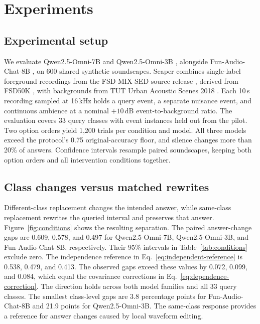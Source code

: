 \section{Experiments}
\label{sec:results}

\subsection{Experimental setup}
We evaluate Qwen2.5-Omni-7B and Qwen2.5-Omni-3B
\cite{qwen25omni2025}, alongside Fun-Audio-Chat-8B
\cite{funaudiochat2026}, on 600 shared synthetic soundscapes. Scaper
\cite{salamon2017scaper} combines single-label foreground recordings from
the FSD-MIX-SED source release \cite{wang2021shots}, derived from FSD50K
\cite{fonseca2021fsd50k}, with backgrounds from TUT Urban Acoustic Scenes
2018 \cite{heittola2018tut}. Each 10\,s recording sampled at 16\,kHz holds a
query event, a separate nuisance event, and continuous ambience at a nominal
$+10$\,dB event-to-background ratio. The evaluation covers 33 query classes
with event instances held out from the pilot. Two option orders yield 1,200
trials per condition and model. All three models exceed the protocol's 0.75
original-accuracy floor, and silence changes more than 20\% of answers.
Confidence intervals resample paired soundscapes, keeping both option orders
and all intervention conditions together.

\subsection{Class changes versus matched rewrites}
Different-class replacement changes the intended answer, while same-class
replacement rewrites the queried interval and preserves that answer.
Figure~\ref{fig:conditions} shows the resulting separation. The paired
answer-change gaps are 0.609, 0.578, and 0.497 for Qwen2.5-Omni-7B,
Qwen2.5-Omni-3B, and Fun-Audio-Chat-8B, respectively. Their 95\% intervals
in Table~\ref{tab:conditions} exclude zero. The independence reference in
Eq.~\ref{eq:independent-reference} is 0.538, 0.479, and 0.413. The observed
gaps exceed these values by 0.072, 0.099, and 0.084, which equal the
covariance corrections in Eq.~\ref{eq:dependence-correction}. The direction
holds across both model families and all 33 query classes. The smallest
class-level gaps are 3.8 percentage points for Fun-Audio-Chat-8B and 21.9
points for Qwen2.5-Omni-3B. The same-class response provides a reference for
answer changes caused by local waveform editing.

